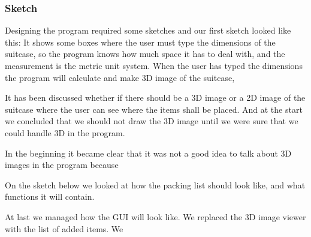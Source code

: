 \subsubsection{Sketch}

Designing the program required some sketches and our first sketch looked like this:
It shows some boxes where the user must type the dimensions of the suitcase, so the program knows how much space it has to deal with, and the measurement is the metric unit system.
When the user has typed the dimensions the program will calculate and make 3D image of the suitcase, 


It has been discussed whether if there should be a 3D image or a 2D image of the suitcase where the user can see where the items shall be placed. And at the start we concluded that we should not draw the 3D image until we were sure that we could handle 3D in the program. 

In the beginning it became clear that it was not a good idea to talk about 3D images in the program because 


On the sketch below we looked at how the packing list should look like, and what functions it will contain.


At last we managed how the GUI will look like. We replaced the 3D image viewer with the list of added items. We 



